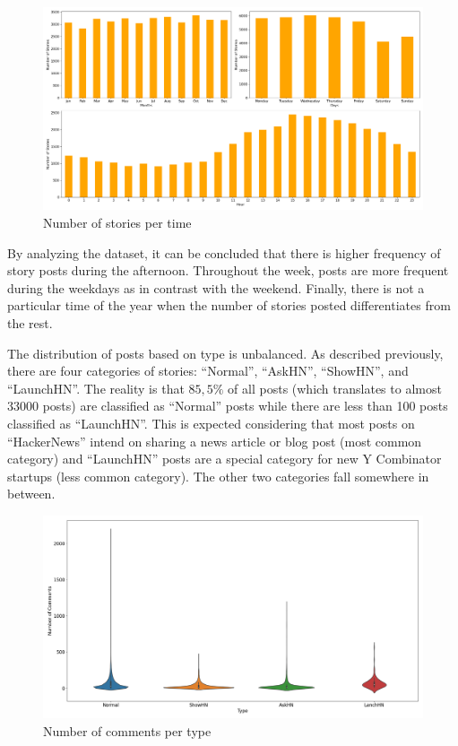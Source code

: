 \documentclass[sigconf]{acmart}
\begin{document}
\begin{figure}[htb!]
   \centering
   \includegraphics[width=\linewidth]{fig/stories_per_time.png}
    \caption{Number of stories per time}
    \label{fig:stories_per_time}
\end{figure}

By analyzing the dataset, it can be concluded that there is higher
frequency of story posts during the afternoon. Throughout the week,
posts are more frequent during the weekdays as in contrast with
the weekend. Finally, there is not a particular time of the year
when the number of stories posted differentiates from the rest.

The distribution of posts based on type is unbalanced. As described
previously, there are four categories of stories: ``Normal'', ``AskHN'',
``ShowHN'', and ``LaunchHN''. The reality is that $85,5\%$ of all posts
(which translates to almost 33000 posts) are classified as ``Normal''
posts while there are less than 100 posts classified as ``LaunchHN''.
This is expected considering that most posts on ``HackerNews'' intend
on sharing a news article or blog post (most common category) and
``LaunchHN'' posts are a special category for new Y Combinator startups
(less common category). The other two categories fall somewhere in between.

\begin{figure}[htb!]
   \centering
   \includegraphics[width=\linewidth]{fig/descendants_per_type.png}
    \caption{Number of comments per type}
    \label{fig:descendants_per_type}
\end{figure}
\end{document}
